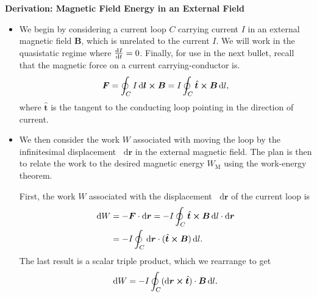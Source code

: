 \documentclass[11pt, a4paper]{article}
\newcommand{\diff}{\mathop{}\!\mathrm{d}} %
\renewcommand{\vec}[1]{\bm{#1}} %
\newcommand{\uvec}[1]{\hat{\vec{#1}}} %
\renewcommand{\r}{\vec{r}}
\newcommand{\B}{\vec{B}} %
\begin{document}
\textbf{Derivation: Magnetic Field Energy in an External Field}
\begin{itemize}
    \item We begin by considering a current loop $ C $ carrying current $ I $ in an external magnetic field $ \B $, which is unrelated to the current $ I $. We will work in the quasistatic regime where $ \dv{I}{t} = 0 $. Finally, for use in the next bullet, recall that the magnetic force on a current carrying-conductor is.
	\begin{equation*}
		\vec{F} = \oint_{C} I \diff \vec{l} \cross \B = I \oint_{C} \uvec{t} \cross \B \diff l,
	\end{equation*}
	where $ \uvec{t} $ is the tangent to the conducting loop pointing in the direction of current.
	
	\item We then consider the work $ W $ associated with moving the loop by the infinitesimal displacement $ \diff \r $ in the external magnetic field. The plan is then to relate the work to the desired magnetic energy $ W_{\text{M}} $ using the work-energy theorem. 

    First, the work $ W $ associated with the displacement $ \diff \r $ of the current loop is
	\begin{align*}
		\diff W &= - \vec{F} \cdot \diff \r =  -I \oint_{C} \uvec{t} \cross \B \diff l \cdot \diff \r\\
		& = - I \oint_{C}\diff \r \cdot (\uvec{t} \cross \B) \diff l.
	\end{align*}
    The last result is a scalar triple product, which we rearrange to get
	\begin{equation*}
		\diff W = - I \oint_{C} (\diff \r \cross \uvec{t})\cdot \B \diff l.
	\end{equation*}
	

\end{itemize}
\end{document}
